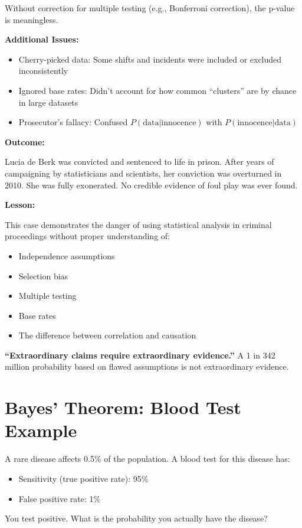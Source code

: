 \documentclass[11pt,a4paper]{article}
\begin{document}
\begin{answer}
\begin{enumerate}[leftmargin=*]
    Without correction for multiple testing (e.g., Bonferroni correction), the p-value is meaningless.
\end{enumerate}

\vspace{0.3cm}
\textbf{Additional Issues:}
\begin{itemize}
    \item Cherry-picked data: Some shifts and incidents were included or excluded inconsistently
    \item Ignored base rates: Didn't account for how common ``clusters'' are by chance in large datasets
    \item Prosecutor's fallacy: Confused $P(\text{data}|\text{innocence})$ with $P(\text{innocence}|\text{data})$
\end{itemize}

\vspace{0.3cm}
\textbf{Outcome:}

Lucia de Berk was convicted and sentenced to life in prison. After years of campaigning by statisticians and scientists, her conviction was overturned in 2010. She was fully exonerated. No credible evidence of foul play was ever found.

\vspace{0.3cm}
\textbf{Lesson:}

This case demonstrates the danger of using statistical analysis in criminal proceedings without proper understanding of:
\begin{itemize}
    \item Independence assumptions
    \item Selection bias
    \item Multiple testing
    \item Base rates
    \item The difference between correlation and causation
\end{itemize}

\textbf{``Extraordinary claims require extraordinary evidence.''} A 1 in 342 million probability based on flawed assumptions is not extraordinary evidence.
\end{answer}

\newpage
\section{Bayes' Theorem: Blood Test Example}

\begin{question}
A rare disease affects 0.5\% of the population. A blood test for this disease has:
\begin{itemize}
    \item Sensitivity (true positive rate): 95\%
    \item False positive rate: 1\%
\end{itemize}

You test positive. What is the probability you actually have the disease?
\end{question}
\end{document}
